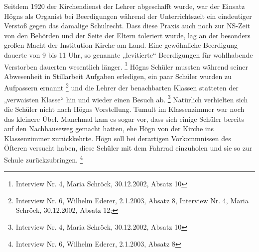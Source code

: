 Seitdem 1920 der Kirchendienst der Lehrer abgeschafft wurde, war der
Einsatz Högns als Organist bei Beerdigungen während der Unterrichtszeit
ein eindeutiger Verstoß gegen das damalige Schulrecht. Dass diese
Praxis auch noch zur NS-Zeit von den Behörden und der Seite der Eltern
toleriert wurde, lag an der besonders großen Macht der Institution
Kirche am Land. Eine gewöhnliche Beerdigung dauerte von 9 bis 11 Uhr,
so genannte „levitierte“ Beerdigungen für wohlhabende Verstorben
dauerten wesentlich länger. \footnote{Interview Nr. 4, Maria Schröck,
30.12.2002, Absatz 10} Högns Schüler mussten während seiner Abwesenheit
in Stillarbeit Aufgaben erledigen, ein paar Schüler wurden zu
Aufpassern ernannt \footnote{Interview Nr. 6, Wilhelm Ederer, 2.1.2003,
Absatz 8, Interview Nr. 4, Maria Schröck, 30.12.2002, Absatz 12;} und
die Lehrer der benachbarten Klassen statteten der „verwaisten Klasse“
hin und wieder einen Besuch ab. \footnote{Interview Nr. 4, Maria
Schröck, 30.12.2002, Absatz 10} Natürlich verhielten sich die Schüler
nicht nach Högns Vorstellung. Tumult im Klassenzimmer war noch das
kleinere Übel. Manchmal kam es sogar vor, dass sich einige Schüler
bereits auf den Nachhauseweg gemacht hatten, ehe Högn von der Kirche
ins Klassenzimmer zurückkehrte. Högn soll bei derartigen Vorkommnissen
des Öfteren versucht haben, diese Schüler mit dem Fahrrad einzuholen
und sie so zur Schule zurückzubringen. \footnote{Interview Nr. 6,
Wilhelm Ederer, 2.1.2003, Absatz 8}

